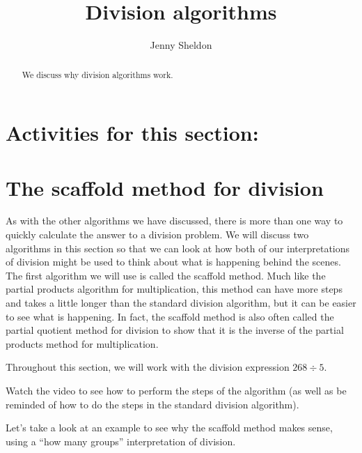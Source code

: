 \documentclass{ximera}
\title{Division algorithms}
\author{Jenny Sheldon}
\begin{document}
\begin{abstract}
We discuss why division algorithms work.
\end{abstract}
\maketitle

\section{Activities for this section:} 

\section{The scaffold method for division}

As with the other algorithms we have discussed, there is more than one way to quickly calculate the answer to a division problem. We will discuss two algorithms in this section so that we can look at how both of our interpretations of division might be used to think about what is happening behind the scenes. The first algorithm we will use is called the scaffold method. Much like the partial products algorithm for multiplication, this method can have more steps and takes a little longer than the standard division algorithm, but it can be  easier to see what is happening. In fact, the scaffold method is also often called the partial quotient method for division to show that it is the inverse of the partial products method for multiplication.

Throughout this section, we will work with the division expression $268 \div 5$.

Watch the video to see how to perform the steps of the algorithm (as well as be reminded of how to do the steps in the standard division algorithm).


Let's take a look at an example to see why the scaffold method makes sense, using a ``how many groups'' interpretation of division.
\end{document}
